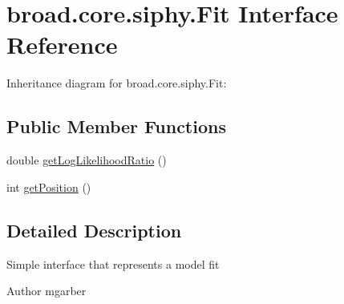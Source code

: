 \hypertarget{interfacebroad_1_1core_1_1siphy_1_1_fit}{\section{broad.\+core.\+siphy.\+Fit Interface Reference}
\label{interfacebroad_1_1core_1_1siphy_1_1_fit}
}


Inheritance diagram for broad.\+core.\+siphy.\+Fit\+:
\subsection*{Public Member Functions}
\begin{DoxyCompactItemize}
\item 
double \hyperlink{interfacebroad_1_1core_1_1siphy_1_1_fit_a01c537a969cdb5e701cdd196c504a0a7}{get\+Log\+Likelihood\+Ratio} ()
\item 
int \hyperlink{interfacebroad_1_1core_1_1siphy_1_1_fit_acd7d4b4ccc02fec178920ac66a6322f4}{get\+Position} ()
\end{DoxyCompactItemize}


\subsection{Detailed Description}
Simple interface that represents a model fit \begin{DoxyAuthor}{Author}
mgarber 
\end{DoxyAuthor}


